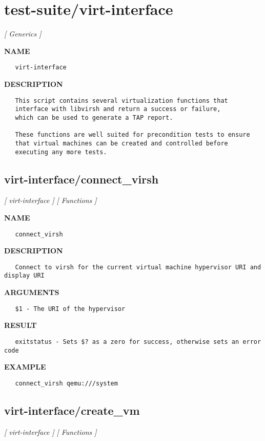 \section{test-suite/virt-interface}
\textsl{[ Generics ]}

\label{ch:robo31}
\label{ch:test_suite_virt_interface}
\textbf{NAME}
\begin{verbatim}
   virt-interface
\end{verbatim}
\textbf{DESCRIPTION}
\begin{verbatim}
   This script contains several virtualization functions that
   interface with libvirsh and return a success or failure, 
   which can be used to generate a TAP report.

   These functions are well suited for precondition tests to ensure
   that virtual machines can be created and controlled before 
   executing any more tests.
\end{verbatim}
\newpage
\subsection{virt-interface/connect\_virsh}
\textsl{[ virt-interface ]}
\textsl{[ Functions ]}

\label{ch:robo33}
\label{ch:virt_interface_connect_virsh}
\textbf{NAME}
\begin{verbatim}
   connect_virsh
\end{verbatim}
\textbf{DESCRIPTION}
\begin{verbatim}
   Connect to virsh for the current virtual machine hypervisor URI and display URI
\end{verbatim}
\textbf{ARGUMENTS}
\begin{verbatim}
   $1 - The URI of the hypervisor
\end{verbatim}
\textbf{RESULT}
\begin{verbatim}
   exitstatus - Sets $? as a zero for success, otherwise sets an error code
\end{verbatim}
\textbf{EXAMPLE}
\begin{verbatim}
   connect_virsh qemu:///system
\end{verbatim}
\newpage
\subsection{virt-interface/create\_vm}
\textsl{[ virt-interface ]}
\textsl{[ Functions ]}

